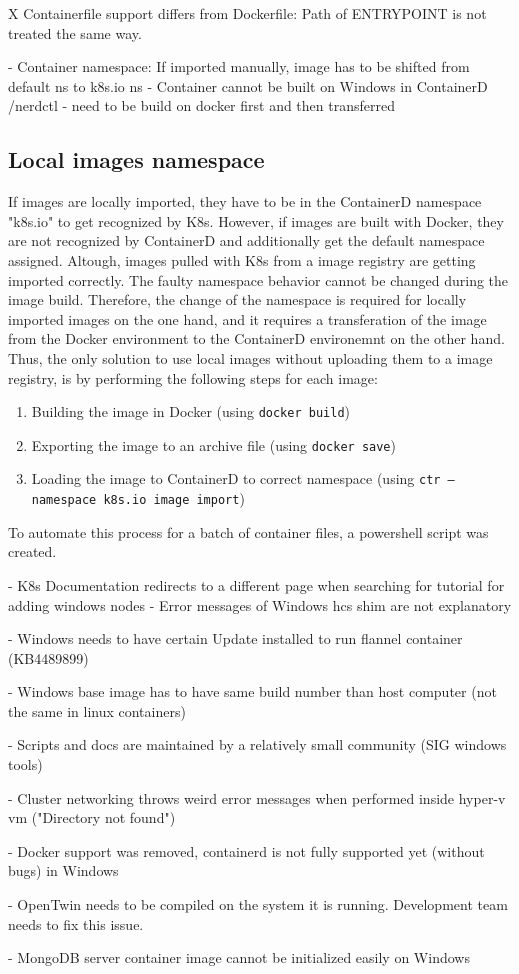 

X Containerfile support differs from Dockerfile: Path of ENTRYPOINT is not treated the same way.


- Container namespace: If imported manually, image has to be shifted from default ns to k8s.io ns
	- Container cannot be built on Windows in ContainerD /nerdctl - need to be build on docker first and then transferred

\subsection{Local images namespace}
If images are locally imported, they have to be in the ContainerD namespace "k8s.io" to get recognized by \ac{K8s}. However, if images are built with Docker, they are not recognized by ContainerD and additionally get the default namespace assigned. Altough, images pulled with \ac{K8s} from a image registry are getting imported correctly. The faulty namespace behavior cannot be changed during the image build.  Therefore, the change of the namespace is required for locally imported images on the one hand, and it requires a transferation of the image from the Docker environment to the ContainerD environemnt on the other hand.
Thus, the only solution to use local images without uploading them to a image registry, is by performing the following steps for each image:
\begin{enumerate}
	\item Building the image in Docker (using \texttt{docker build})
	\item Exporting the image to an archive file (using \texttt{docker save})
	\item Loading the image to ContainerD to correct namespace (using \texttt{ctr --namespace k8s.io image import})
\end{enumerate}
To automate this process for a batch of container files, a powershell script was created.



- K8s Documentation redirects to a different page when searching for tutorial for adding windows nodes
- Error messages of Windows hcs shim are not explanatory

- Windows needs to have certain Update installed to run flannel container (KB4489899)

- Windows base image has to have same build number than host computer (not the same in linux containers)

- Scripts and docs are maintained by a relatively small community (SIG windows tools)

- Cluster networking throws weird error messages when performed inside hyper-v vm ("Directory not found")

- Docker support was removed, containerd is not fully supported yet (without bugs) in Windows

- OpenTwin needs to be compiled on the system it is running. Development team needs to fix this issue.

- MongoDB server container image cannot be initialized easily on Windows
